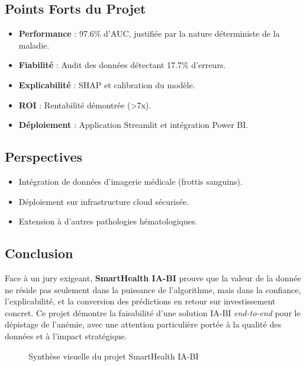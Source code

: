 \documentclass[12pt,a4paper]{article}
\begin{document}
\subsection{Points Forts du Projet}
\begin{itemize}[label=\checkmark]
    \item \textbf{Performance} : 97.6\% d'AUC, justifiée par la nature déterministe de la maladie.
    \item \textbf{Fiabilité} : Audit des données détectant 17.7\% d'erreurs.
    \item \textbf{Explicabilité} : SHAP et calibration du modèle.
    \item \textbf{ROI} : Rentabilité démontrée (>7x).
    \item \textbf{Déploiement} : Application Streamlit et intégration Power BI.
\end{itemize}

\subsection{Perspectives}
\begin{itemize}
    \item Intégration de données d'imagerie médicale (frottis sanguins).
    \item Déploiement sur infrastructure cloud sécurisée.
    \item Extension à d'autres pathologies hématologiques.
\end{itemize}

\subsection{Conclusion}
Face à un jury exigeant, \textbf{SmartHealth IA-BI} prouve que la valeur de la donnée ne réside pas seulement dans la puissance de l'algorithme, mais dans la confiance, l'explicabilité, et la conversion des prédictions en retour sur investissement concret. Ce projet démontre la faisabilité d'une solution IA-BI \textit{end-to-end} pour le dépistage de l'anémie, avec une attention particulière portée à la qualité des données et à l'impact stratégique.

\begin{figure}[H]
\centering
{}
\caption{Synthèse visuelle du projet SmartHealth IA-BI}
\label{fig:project_summary}
\end{figure}
\end{document}
